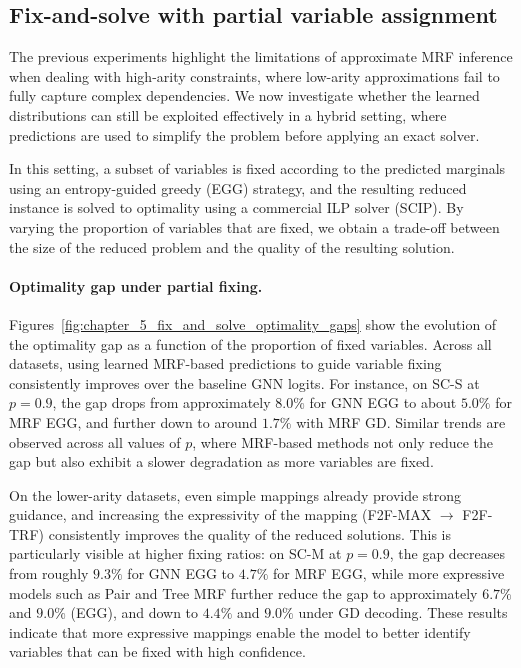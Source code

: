 

\subsection{Fix-and-solve with partial variable assignment}
\label{subsec:chapter_5_fix_and_solve}

The previous experiments highlight the limitations of approximate MRF inference when dealing with high-arity constraints, where low-arity approximations fail to fully capture complex dependencies. We now investigate whether the learned distributions can still be exploited effectively in a hybrid setting, where predictions are used to simplify the problem before applying an exact solver.

In this setting, a subset of variables is fixed according to the predicted marginals using an entropy-guided greedy (EGG) strategy, and the resulting reduced instance is solved to optimality using a commercial ILP solver (SCIP). By varying the proportion of variables that are fixed, we obtain a trade-off between the size of the reduced problem and the quality of the resulting solution.

\paragraph{Optimality gap under partial fixing.}






Figures~\ref{fig:chapter_5_fix_and_solve_optimality_gaps} show the evolution of the optimality gap as a function of the proportion of fixed variables. Across all datasets, using learned MRF-based predictions to guide variable fixing consistently improves over the baseline GNN logits. For instance, on SC-S at $p=0.9$, the gap drops from approximately $8.0\%$ for GNN EGG to about $5.0\%$ for MRF EGG, and further down to around $1.7\%$ with MRF GD. Similar trends are observed across all values of $p$, where MRF-based methods not only reduce the gap but also exhibit a slower degradation as more variables are fixed.

On the lower-arity datasets, even simple mappings already provide strong guidance, and increasing the expressivity of the mapping (F2F-MAX $\rightarrow$ F2F-TRF) consistently improves the quality of the reduced solutions. This is particularly visible at higher fixing ratios: on SC-M at $p=0.9$, the gap decreases from roughly $9.3\%$ for GNN EGG to $4.7\%$ for MRF EGG, while more expressive models such as Pair and Tree MRF further reduce the gap to approximately $6.7\%$ and $9.0\%$ (EGG), and down to $4.4\%$ and $9.0\%$ under GD decoding. These results indicate that more expressive mappings enable the model to better identify variables that can be fixed with high confidence.

